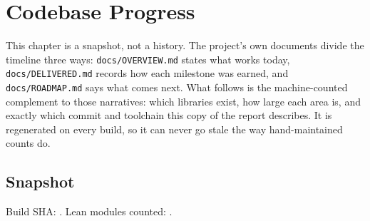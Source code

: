 \chapter{Codebase Progress}
\label{ch:progress}


This chapter is a snapshot, not a history. The project's own documents
divide the timeline three ways: \texttt{docs/OVERVIEW.md} states what
works today, \texttt{docs/DELIVERED.md} records how each milestone was
earned, and \texttt{docs/ROADMAP.md} says what comes next. What follows
is the machine-counted complement to those narratives: which libraries
exist, how large each area is, and exactly which commit and toolchain
this copy of the report describes. It is regenerated on every build, so
it can never go stale the way hand-maintained counts do.

\section{Snapshot}

Build SHA: \circegitsha. Lean modules counted: \circemodulecount.

